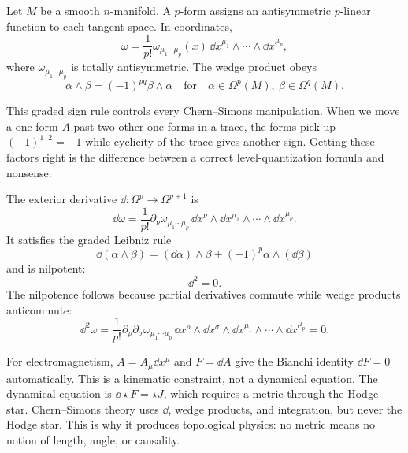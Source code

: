 Let $M$ be a smooth $n$-manifold. A $p$-form assigns an antisymmetric $p$-linear function to each tangent space. In coordinates,
\begin{equation}
  \omega
  =
  \frac{1}{p!}\omega_{\mu_1\cdots\mu_p}(x)
  \,\dd x^{\mu_1}\wedge\cdots\wedge \dd x^{\mu_p},
  \label{eq:forms-pform}
\end{equation}
where $\omega_{\mu_1\cdots\mu_p}$ is totally antisymmetric. The wedge product obeys
\begin{equation}
  \alpha\wedge\beta
  =
  (-1)^{pq}\beta\wedge\alpha
  \quad\text{for}\quad
  \alpha\in\Omega^p(M),\ \beta\in\Omega^q(M).
  \label{eq:forms-graded-comm}
\end{equation}

This graded sign rule controls every Chern--Simons manipulation. When we move a one-form $A$ past two other one-forms in a trace, the forms pick up $(-1)^{1\cdot 2}=-1$ while cyclicity of the trace gives another sign. Getting these factors right is the difference between a correct level-quantization formula and nonsense.

The exterior derivative $\dd:\Omega^p\to\Omega^{p+1}$ is
\begin{equation}
  \dd\omega
  =
  \frac{1}{p!}\partial_\nu \omega_{\mu_1\cdots\mu_p}
  \,\dd x^\nu\wedge \dd x^{\mu_1}\wedge\cdots\wedge \dd x^{\mu_p}.
  \label{eq:forms-exterior-derivative}
\end{equation}
It satisfies the graded Leibniz rule
\begin{equation}
  \dd(\alpha\wedge\beta)
  =
  (\dd\alpha)\wedge\beta
  +
  (-1)^p\alpha\wedge(\dd\beta)
  \label{eq:forms-leibniz}
\end{equation}
and is nilpotent:
\begin{equation}
  \dd^2=0.
  \label{eq:forms-nilpotent}
\end{equation}
The nilpotence follows because partial derivatives commute while wedge products anticommute:
\begin{equation}
  \dd^2\omega
  =
  \frac{1}{p!}
  \partial_\rho\partial_\sigma\omega_{\mu_1\cdots\mu_p}
  \,\dd x^\rho\wedge\dd x^\sigma
  \wedge\dd x^{\mu_1}\wedge\cdots\wedge\dd x^{\mu_p}
  =
  0.
  \label{eq:forms-ddzero}
\end{equation}

For electromagnetism, $A=A_\mu\dd x^\mu$ and $F=\dd A$ give the Bianchi identity $\dd F=0$ automatically. This is a kinematic constraint, not a dynamical equation. The dynamical equation is $\dd\star F=\star J$, which requires a metric through the Hodge star. Chern--Simons theory uses $\dd$, wedge products, and integration, but never the Hodge star. This is why it produces topological physics: no metric means no notion of length, angle, or causality.

